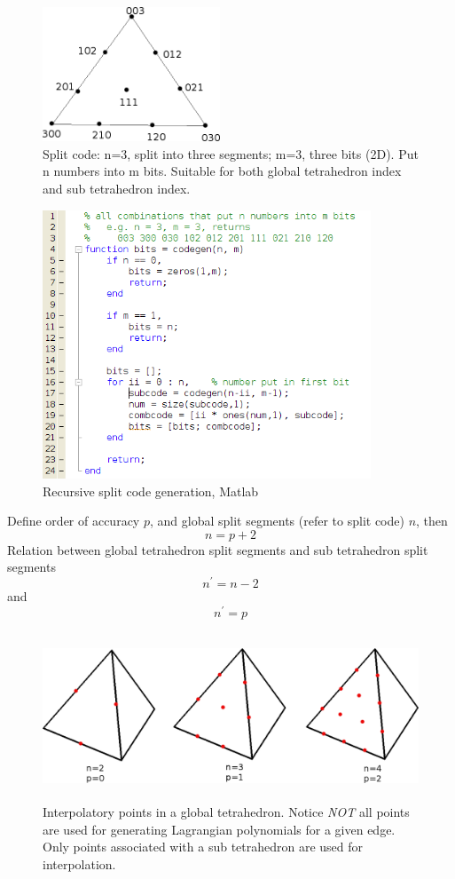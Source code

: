 \documentclass[a4paper,onecolumn]{article}
\begin{document}
\begin{figure}\begin{center}
    \includegraphics[height=4cm]{code.png}
    \caption{Split code: n=3, split into three segments; m=3, three bits (2D). Put n numbers into m bits. Suitable for both
    global tetrahedron index and sub tetrahedron index.}
\end{center}\end{figure}
\begin{figure}\begin{center}
    \includegraphics[height=8cm]{codegen.png}
    \caption{Recursive split code generation, Matlab}
\end{center}\end{figure}
\noindent Define order of accuracy $p$, and global split segments (refer to split code) $n$, then
$$
    n = p+2
$$
Relation between global tetrahedron split segments and sub tetrahedron split segments
$$
    n^\prime = n-2
$$
and
$$
    n^\prime = p
$$
\begin{figure}\begin{center}
    \includegraphics[height=5cm]{interppoint.png}
    \caption{Interpolatory points in a global tetrahedron. Notice \emph{NOT} all points are used
    for generating Lagrangian polynomials for a given edge. Only points associated with a sub tetrahedron
    are used for interpolation. }
\end{center}\end{figure}
\end{document}

